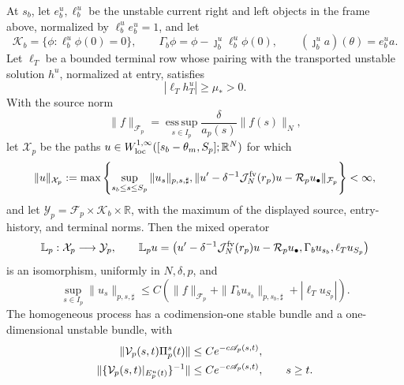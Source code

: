 \begin{proposition}
At \(s_b\), let \(e_b^u,\ell_b^u\) be the unstable current right and left
objects in the frame above, normalized by \(\ell_b^ue_b^u=1\), and let
\begin{equation}
 \mathscr K_b=\{\phi:\ell_b^u\phi(0)=0\},\qquad
 \Gamma_b\phi=\phi-\jmath_b^u\ell_b^u\phi(0),
 \qquad (\jmath_b^ua)(\theta)=e_b^ua.
 \label{eq:anchor-toolkit-entry-coordinate}
\end{equation}
Let \(\ell_T\) be a bounded terminal row whose pairing with the transported
unstable solution \(h^u\), normalized at entry, satisfies
\begin{equation}
 |\ell_T h_T^u|\ge\mu_*>0.
 \label{eq:anchor-toolkit-terminal-margin}
\end{equation}
With the source norm
\begin{equation}
 \|f\|_{\mathcal F_p}
 =\operatorname*{ess\,sup}_{s\in I_p}
       \frac\delta{a_p(s)}\|f(s)\|_N,
 \label{eq:anchor-toolkit-source-norm}
\end{equation}
let \(\mathcal X_p\) be the paths
\(u\in W_{\rm loc}^{1,\infty}
([s_b-\theta_m,S_p];\mathbb R^N)\) for which
\[
 \|u\|_{\mathcal X_p}:=
 \max\left\{\sup_{s_b\le s\le S_p}\|u_s\|_{p,s,\sharp},
 \|u'-\delta^{-1}\mathcal J_N^{\rm fv}(r_p)u
            -\mathcal R_pu_\bullet\|_{\mathcal F_p}\right\}<\infty ,
\]
and let
\(\mathcal Y_p=\mathcal F_p\times\mathscr K_b\times\mathbb R\), with
the maximum of the displayed source, entry-history, and terminal norms.
Then the mixed operator
\begin{equation}
 \mathbb L_p:\mathcal X_p\longrightarrow\mathcal Y_p,\qquad
 \mathbb L_pu=
 \left(u'-\delta^{-1}\mathcal J_N^{\rm fv}(r_p)u
             -\mathcal R_pu_\bullet,
       \Gamma_bu_{s_b},\ell_Tu_{S_p}\right)
 \label{eq:anchor-toolkit-mixed-operator}
\end{equation}
is an isomorphism, uniformly in \(N,\delta,p\), and
\begin{equation}
 \sup_{s\in I_p}\|u_s\|_{p,s,\sharp}
 \le C\left(\|f\|_{\mathcal F_p}
       +\|\Gamma_bu_{s_b}\|_{p,s_b,\sharp}
       +|\ell_Tu_{S_p}|\right).
 \label{eq:anchor-toolkit-mixed-inverse}
\end{equation}
The homogeneous process has a codimension-one stable bundle and a
one-dimensional unstable bundle, with
\begin{align}
 \|\mathcal V_p(s,t)\Pi_p^s(t)\|
 &\le Ce^{-c\mathscr A_p(s,t)},\notag\\
 \|\{\mathcal V_p(s,t)|_{E_p^u(t)}\}^{-1}\|
 &\le Ce^{-c\mathscr A_p(s,t)},\qquad s\ge t.
 \label{eq:anchor-toolkit-core-dichotomy}
\end{align}


\end{proposition}
